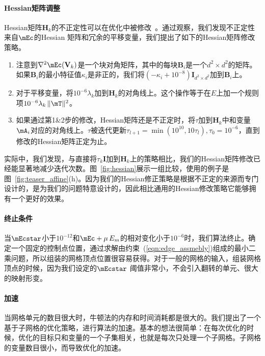 \paragraph{Hessian矩阵调整} Hessian矩阵$\mathbf{H}_k$的不正定性可以在优化中被修改~\cite{Nocedal2006}。通过观察，我们发现不正定性来自$\mEc$的Hessian 矩阵和冗余的平移变量，我们提出了如下的Hessian矩阵修改策略。
\begin{enumerate}
\item 注意到$\nabla^2 \mEc(\mathbf{V}_{k})$是一个块对角矩阵，其中的每块$\mathbf{B}_i$是一个$d^2 \times d^2$的矩阵。如果$\mathbf{B}_i$的最小特征值$\kappa_i$是非正的，我们将$(-\kappa_i+10^{-8}) \mathbf{I}_{d^2\times d^2}$加到$\mathbf{B}_i$上。

\item 对于平移变量，将$10^{-6}\lambda_k$加到$\mathbf{H}_k$的对角线上。这个操作等于在$E$上加一个规则项$10^{-6}\lambda_k\,\|\mT\|^2$。

\item 如果通过第1\&2步的修改，Hessian矩阵还是不正定时，将$\tau$加到$\mathbf{H}_k$中和变量$\mA_i$对应的对角线上。$\tau$被迭代更新$\tau_{l+1} = \min(10^{10}, 10 \tau_{l}), \tau_0 = 10^{-6}$，直到修改的Hessian矩阵正定为止。
\end{enumerate}

实际中，我们发现，与直接将$\tau_k \mathbf{I}$加到$\mathbf{H}_k$上的策略相比，我们的Hessian矩阵修改已经能显著地减少迭代次数。图~\ref{fig:hessian}展示一组比较，使用的例子是图~\ref{fig:teaser_affine}(h)。因为我们的Hessian修正策略是根据不正定的来源而专门设计的，是为我们的问题特意设计的，因此相比通用的Hessian修改策略它能够拥有一个更好的效果。

\paragraph{终止条件} 当$\mEcstar$小于$10^{-12}$和$\mEc + \mu \, E_{m}$的相对变化小于$10^{-6}$时，我们算法终止。确定一个固定的控制点位置，通过求解由约束~(\ref{eqn:edge_assmebly})组成的最小二乘问题，所以组装的网格顶点位置很容易获得。对于一般的网格的输入，组装网格顶点的时候，因为我们设定的$\mEcstar$ 阈值非常小，不会引入翻转的单元、很大的映射形变。

\paragraph{加速} 当网格单元的数目很大时，牛顿法的内存和时间消耗都是很大的。我们提出了一个基于子网格的优化策略，进行算法的加速。基本的想法很简单：在每次优化的时候，优化的目标只和变量的一个子集相关，也就是每次只处理一个子网格。子网格的变量数目很小，而导致优化的加速。

